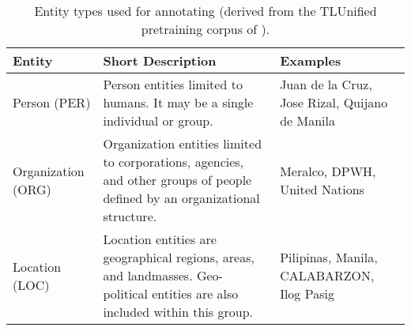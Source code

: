\documentclass[../report.tex]{subfiles}
\begin{document}
\begin{table*}[t]
\begin{tabular}{@{}p{2cm}p{9cm}p{4cm}@{}}
\toprule
Entity             & Short Description                                                                                                              & Examples                                       \\ \midrule
Person (PER)       & Person entities limited to humans. It may be a single individual or group.                                                     & Juan de la Cruz, Jose Rizal, Quijano de Manila \\
Organization (ORG) & Organization entities limited to corporations, agencies, and other groups of people defined by an organizational structure.    & Meralco, DPWH, United Nations                  \\
Location (LOC)     & Location entities are geographical regions, areas, and landmasses. Geo-political entities are also included within this group. & Pilipinas, Manila, CALABARZON, Ilog Pasig        \\ \bottomrule
\end{tabular}
\caption{
Entity types used for annotating \tlunified{} (derived from the TLUnified pretraining corpus of \citealp{Cruz2021ImprovingLL}).
}
\label{table:entity_types}
\end{table*}
\end{document}
